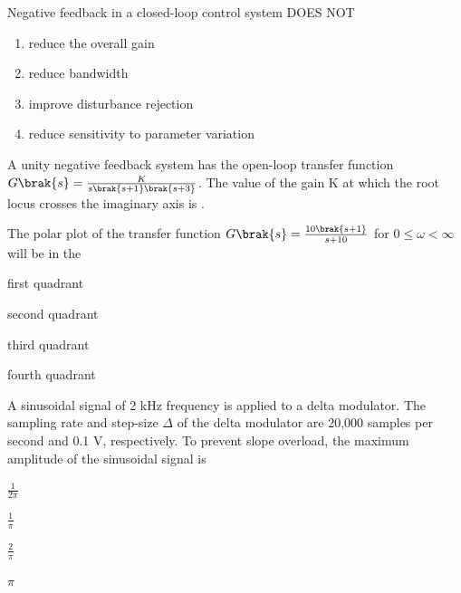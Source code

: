     \hfill{}

    \item Negative feedback in a closed-loop control system DOES NOT
    \begin{enumerate}
        \item reduce the overall gain
        \item reduce bandwidth
        \item improve disturbance rejection
        \item reduce sensitivity to parameter variation
    \end{enumerate}
    
    \hfill{}

    \item A unity negative feedback system has the open-loop transfer function $G\brak{s}=\frac{K}{s\brak{s+1}\brak{s+3}}$. The value of the gain K  at which the root locus crosses the imaginary axis is \underline{\hspace{2cm}}.
    
    \hfill{}

    \item The polar plot of the transfer function $G\brak{s}=\frac{10\brak{s+1}}{s+10}$ for $0\le\omega<\infty$ will be in the
    \begin{enumerate}
        \begin{multicols}{2}
            \item first quadrant
            \item second quadrant
            \item third quadrant
            \item fourth quadrant
        \end{multicols}
    \end{enumerate}
    
    \hfill{}

    \item A sinusoidal signal of 2 kHz frequency is applied to a delta modulator. The sampling rate and step-size $\Delta$ of the delta modulator are 20,000 samples per second and 0.1 V, respectively. To prevent slope overload, the maximum amplitude of the sinusoidal signal  is
    \begin{enumerate}
        \begin{multicols}{2}
            \item $\frac{1}{2\pi}$
            \item $\frac{1}{\pi}$
            \item $\frac{2}{\pi}$
            \item $\pi$
        \end{multicols}
    \end{enumerate}
    
